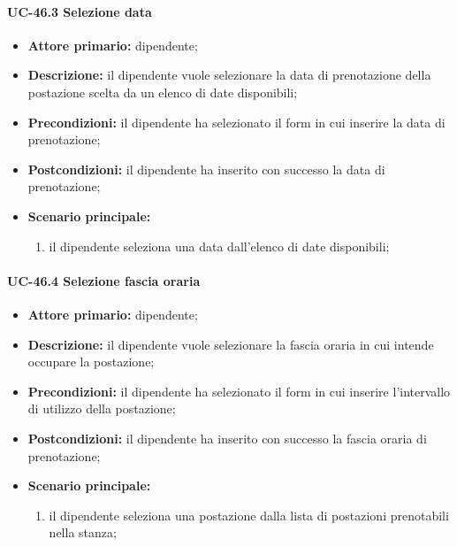 \paragraph{UC-46.3 Selezione data}

    \begin{itemize}
        \item \textbf{Attore primario:} dipendente;

        \item \textbf{Descrizione:} il dipendente vuole selezionare la data di prenotazione della postazione scelta da un elenco di date disponibili;

        \item \textbf{Precondizioni:} il dipendente ha selezionato il form in cui inserire la data di prenotazione;

        \item \textbf{Postcondizioni:} il dipendente ha inserito con successo la data di prenotazione;

        \item \textbf{Scenario principale:}
            \begin{enumerate}
                \item il dipendente seleziona una data dall'elenco di date disponibili;
            \end{enumerate}
    \end{itemize}

\paragraph{UC-46.4 Selezione fascia oraria}

    \begin{itemize}
        \item \textbf{Attore primario:} dipendente;

        \item \textbf{Descrizione:} il dipendente vuole selezionare la fascia oraria in cui intende occupare la postazione;

        \item \textbf{Precondizioni:} il dipendente ha selezionato il form in cui inserire l'intervallo di utilizzo della postazione;

        \item \textbf{Postcondizioni:} il dipendente ha inserito con successo la fascia oraria di prenotazione;

        \item \textbf{Scenario principale:}
            \begin{enumerate}
                \item il dipendente seleziona una postazione dalla lista di postazioni prenotabili nella stanza;
            \end{enumerate}
    \end{itemize}

